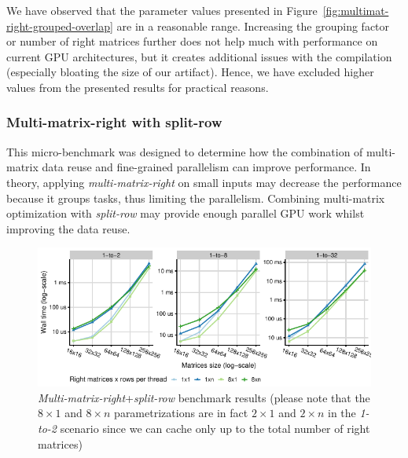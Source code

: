 We have observed that the parameter values presented in Figure~\ref{fig:multimat-right-grouped-overlap} are in a reasonable range. Increasing the grouping factor or number of right matrices further does not help much with performance on current GPU architectures, but it creates additional issues with the compilation (especially bloating the size of our artifact). Hence, we have excluded higher values from the presented results for practical reasons.


\subsubsection{Multi-matrix-right with split-row}

This micro-benchmark was designed to determine how the combination of multi-matrix data reuse and fine-grained parallelism can improve performance. In theory, applying \emph{multi-matrix-right} on small inputs may decrease the performance because it groups tasks, thus limiting the parallelism. Combining multi-matrix optimization with \emph{split-row} may provide enough parallel GPU work whilst improving the data reuse.

\begin{figure}[ht]
	\centering
	\includegraphics{crosscorr/plots/one-to-many/multimat-right-split-row.pdf}
	\caption{\emph{Multi-matrix-right}+\emph{split-row} benchmark results (please note that the $8\times1$ and $8\times n$ parametrizations are in fact $2\times1$ and $2\times n$ in the \emph{1-to-2} scenario since we can cache only up to the total number of right matrices)}
	\label{fig:multimat-right-split-row}
\end{figure}

